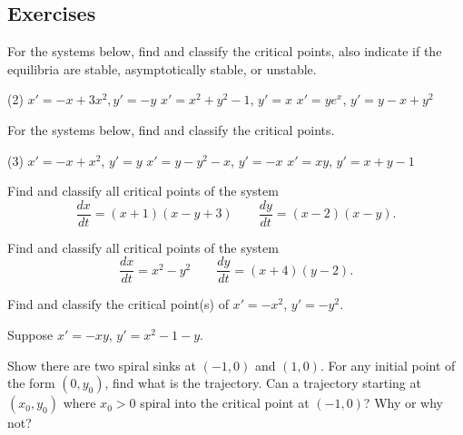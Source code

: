 \subsection{Exercises}

\begin{exercise}
For the systems below, find and classify the critical points, also indicate
if the equilibria are stable, asymptotically stable, or unstable.
\begin{tasks}(2)
\task $x'=-x+3x^2, y'=-y$
\task $x'=x^2+y^2-1$, $y'=x$
\task $x'=ye^x$, $y'=y-x+y^2$
\end{tasks}
\end{exercise}

\begin{exercise}\ansMark%
For the systems below, find and classify the critical points.
\begin{tasks}(3)
\task $x'=-x+x^2$, $y'=y$
\task $x'=y-y^2-x$, $y'=-x$
\task $x'=xy$, $y'=x+y-1$
\end{tasks}
\end{exercise}

\begin{exercise}
Find and classify all critical points of the system
\[ \frac{dx}{dt} = (x+1)(x-y+3) \qquad \frac{dy}{dt} = (x-2)(x-y) .\]
\end{exercise}

\begin{exercise}
Find and classify all critical points of the system
\[ \frac{dx}{dt} = x^2 - y^2 \qquad \frac{dy}{dt} = (x+4)(y-2) .\]
\end{exercise}


\begin{exercise}
Find and classify the critical point(s) of $x' = -x^2$, $y' = -y^2$.
\end{exercise}

\begin{samepage}
\begin{exercise}
Suppose $x'=-xy$, $y'=x^2-1-y$.
\begin{tasks}
\task
Show there are two spiral sinks at
$(-1,0)$ and $(1,0)$.
\task
For any initial point of the form $(0,y_0)$, find what is the trajectory.
\task
Can a trajectory starting at $(x_0,y_0)$ where $x_0 > 0$ spiral into 
the critical point at $(-1,0)$?  Why or why not?
\end{tasks}
\end{exercise}
\end{samepage}

